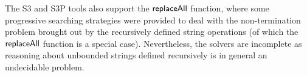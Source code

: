 
 
The S3 and S3P tools also support the $\mathsf{replaceAll}$ function, where some
progressive searching strategies were provided to deal with the non-termination
problem brought out by the recursively defined string operations (of which the
$\mathsf{replaceAll}$ function is a special case). Nevertheless, the solvers are 
incomplete as reasoning about unbounded strings defined recursively is in 
general an undecidable problem.






%



